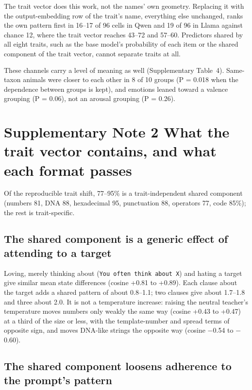 The trait vector does this work, not the names' own geometry. Replacing it with the output-embedding row of the trait's name, everything else unchanged, ranks the own pattern first in 16--17 of 96 cells in Qwen and 19 of 96 in Llama against chance 12, where the trait vector reaches 43--72 and 57--60. Predictors shared by all eight traits, such as the base model's probability of each item or the shared component of the trait vector, cannot separate traits at all.


These channels carry a level of meaning as well (Supplementary Table~4). Same-taxon animals were closer to each other in 8 of 10 groups (P = 0.018 when the dependence between groups is kept), and emotions leaned toward a valence grouping (P = 0.06), not an arousal grouping (P = 0.26).


\section*{Supplementary Note 2 \textperiodcentered{} What the trait vector contains, and what each format passes}

Of the reproducible trait shift, 77--95\% is a trait-independent shared component (numbers 81, DNA 88, hexadecimal 95, punctuation 88, operators 77, code 85\%); the rest is trait-specific.


\subsection*{The shared component is a generic effect of attending to a target}

Loving, merely thinking about (\texttt{You often think about X}) and hating a target give similar mean state differences (cosine +0.81 to +0.89). Each clause about the target adds a shared pattern of about 0.8--1.1; two clauses give about 1.7--1.8 and three about 2.0. It is not a temperature increase: raising the neutral teacher's temperature moves numbers only weakly the same way (cosine +0.43 to +0.47) at a third of the size or less, with the template-number and spread terms of opposite sign, and moves DNA-like strings the opposite way (cosine $-$0.54 to $-$0.60).


\subsection*{The shared component loosens adherence to the prompt's pattern}

